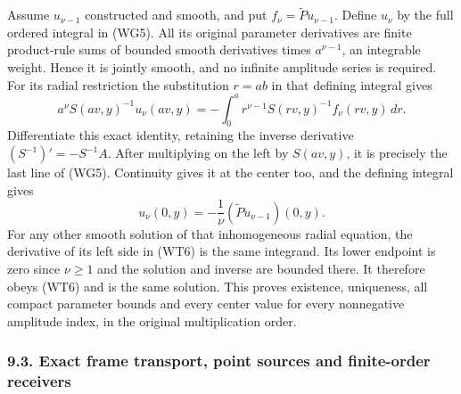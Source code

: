 \documentclass[
  11pt,
]{article}
\begin{document}
Assume \(u_{\nu-1}\) constructed and smooth, and put
\(f_\nu=\widetilde Pu_{\nu-1}\). Define \(u_\nu\) by the full ordered
integral in (WG5). All its original parameter derivatives are finite
product-rule sums of bounded smooth derivatives times \(a^{\nu-1}\), an
integrable weight. Hence it is jointly smooth, and no infinite amplitude
series is required. For its radial restriction the substitution \(r=ab\)
in that defining integral gives \[
 a^\nu S(av,y)^{-1}u_\nu(av,y)
    =-\int_0^a r^{\nu-1}S(rv,y)^{-1}f_\nu(rv,y)\,dr.
 \tag{WT6}
\] Differentiate this exact identity, retaining the inverse derivative
\((S^{-1})'=-S^{-1}A\). After multiplying on the left by \(S(av,y)\), it
is precisely the last line of (WG5). Continuity gives it at the center
too, and the defining integral gives \[
 u_\nu(0,y)=-\frac1\nu(\widetilde Pu_{\nu-1})(0,y).
 \tag{WT7}
\] For any other smooth solution of that inhomogeneous radial equation,
the derivative of its left side in (WT6) is the same integrand. Its
lower endpoint is zero since \(\nu\geq1\) and the solution and inverse
are bounded there. It therefore obeys (WT6) and is the same solution.
This proves existence, uniqueness, all compact parameter bounds and
every center value for every nonnegative amplitude index, in the
original multiplication order.

\subsubsection{9.3. Exact frame transport, point sources and
finite-order
receivers}\label{exact-frame-transport-point-sources-and-finite-order-receivers}
\end{document}
